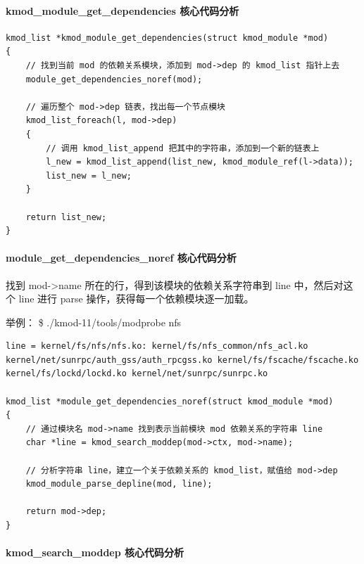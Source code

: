 \documentclass[11pt,a4paper]{article}
\begin{document}
\paragraph{kmod\_module\_get\_dependencies 核心代码分析}

{\begin{shaded}\begin{verbatim}
kmod_list *kmod_module_get_dependencies(struct kmod_module *mod)
{
    // 找到当前 mod 的依赖关系模块，添加到 mod->dep 的 kmod_list 指针上去
    module_get_dependencies_noref(mod);

    // 遍历整个 mod->dep 链表，找出每一个节点模块
    kmod_list_foreach(l, mod->dep)
    {
        // 调用 kmod_list_append 把其中的字符串，添加到一个新的链表上
        l_new = kmod_list_append(list_new, kmod_module_ref(l->data));
        list_new = l_new;
    }

    return list_new;
}
\end{verbatim}\end{shaded}}
\paragraph{module\_get\_dependencies\_noref 核心代码分析}

找到 mod-\textgreater{}name 所在的行，得到该模块的依赖关系字符串到 line
中，然后对这个 line 进行 parse 操作，获得每一个依赖模块逐一加载。

举例： \$ ./kmod-11/tools/modprobe nfs

{\begin{shaded}\begin{verbatim}
line = kernel/fs/nfs/nfs.ko: kernel/fs/nfs_common/nfs_acl.ko kernel/net/sunrpc/auth_gss/auth_rpcgss.ko kernel/fs/fscache/fscache.ko kernel/fs/lockd/lockd.ko kernel/net/sunrpc/sunrpc.ko

kmod_list *module_get_dependencies_noref(struct kmod_module *mod)
{
    // 通过模块名 mod->name 找到表示当前模块 mod 依赖关系的字符串 line
    char *line = kmod_search_moddep(mod->ctx, mod->name);

    // 分析字符串 line，建立一个关于依赖关系的 kmod_list，赋值给 mod->dep
    kmod_module_parse_depline(mod, line);

    return mod->dep;
}
\end{verbatim}\end{shaded}}
\paragraph{kmod\_search\_moddep 核心代码分析}
\end{document}
